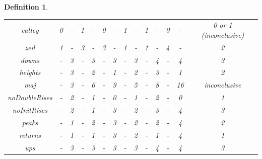 \documentclass[12pt]{article}
\newtheorem{definition}{Definition}
\begin{document}
\begin{definition}
\begin{table}[H]
\begin{tabular}{c | c c c c c c c c c c c c | c}
valley & 0 & - & 1 & - & 0 & - & 1 & - & 1 & - & 0 & - & 0 or 1 (inconclusive)\\
zeil & 1 & - & 3 & - & 3 & - & 1 & - & 1 & - & 4 & - & 2\\
\hline
downs & - & 3 & - & 3 & - & 3 & - & 3 & - & 4 & - & 4 & 3\\
heights & - & 3 & - & 2 & - & 1 & - & 2 & - & 3 & - & 1 & 2\\
maj & - & 3 & - & 6 & - & 9 & - & 5 & - & 8 & - & 16 & inconclusive\\
noDoubleRises & - & 2 & - & 1 & - & 0 & - & 1 & - & 2 & - & 0 & 1\\
noInitRises & - & 2 & - & 1 & - & 3 & - & 2 & - & 3 & - & 4 & 3\\
peaks & - & 1 & - & 2 & - & 3 & - & 2 & - & 2 & - & 4 & 2\\
returns & - & 1 & - & 1 & - & 3 & - & 2 & - & 1 & - & 4 & 1\\
ups & - & 3 & - & 3 & - & 3 & - & 3 & - & 4 & - & 4 & 3\\
\hline
\end{tabular}
\label{table:StandardPerms1}
\end{table}

\end{definition}
\end{document}
